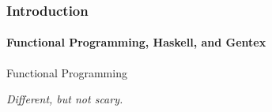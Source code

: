 \begin{frame}
  \frametitle{Introduction}
  \framesubtitle{Functional Programming, Haskell, and Gentex}

  \huge
  Functional Programming

  \normalsize
  \emph{Different, but not scary.}
\end{frame}
